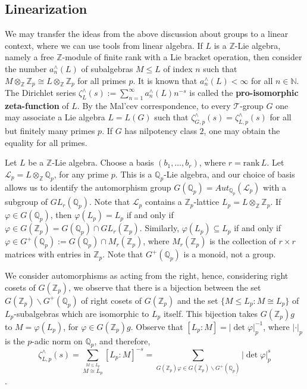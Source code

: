 \documentclass[12pt]{article}
\begin{document}
\subsection{Linearization}
We may transfer the ideas from the above discussion about groups to a linear context, where we can use tools from linear algebra.
If $L$ is a $\mathbb{Z}$-Lie algebra, namely a free $\mathbb{Z}$-module of finite rank with a Lie bracket operation, then consider the number $a_{n}^{\wedge}(L)$ of subalgebras $M\leq L$ of index $n$ such that $M\otimes_{\mathbb{Z}}\mathbb{Z}_p\cong L\otimes_{\mathbb{Z}}\mathbb{Z}_p$ for all primes $p$. It is known that $a_{n}^{\wedge}(L)<\infty$ for all $n\in\mathbb{N}$. The Dirichlet series $\zeta_{L}^{\wedge}(s):=\sum_{n=1}^{\infty}{a_{n}^{\wedge}}(L)n^{-s}$ is called the \textbf{pro-isomorphic zeta-function} of $L$. By the Mal'cev correspondence, to every $\mathcal{T}$-group $G$ one may associate a Lie algebra $L=L(G)$ such that $\zeta_{G,p}^{\wedge}(s)=\zeta_{L,p}^{\wedge}(s)$ for all but finitely many primes $p$. If $G$ has nilpotency class $2$, one may obtain the equality for all primes.\par
Let $L$ be a $\mathbb{Z}$-Lie algebra. Choose a basis $(b_1,\dots,b_r)$, where $r=\mathrm{rank}\,L$. Let $\mathcal{L}_{p}=L\otimes_{\mathbb{Z}}\mathbb{Q}_p$, for any prime $p$. This is a $\mathbb{Q}_p$-Lie algebra, and our choice of basis allows us to identify the automorphism group $G(\mathbb{Q}_p)=Aut_{\mathbb{Q}_p}(\mathcal{L}_{p})$ with a subgroup of $GL_r(\mathbb{Q}_p)$. Note that $\mathcal{L}_{p}$ contains a $\mathbb{Z}_p$-lattice $L_{p}=L\otimes_{\mathbb{Z}}\mathbb{Z}_p$. If $\varphi\in G(\mathbb{Q}_p)$, then $\varphi(L_{p})=L_{p}$ if and only if $\varphi\in G(\mathbb{Z}_p)=G(\mathbb{Q}_p)\cap GL_r(\mathbb{Z}_p)$. Similarly, $\varphi(L_{p})\subseteq L_{p}$ if and only if $\varphi\in G^{+}(\mathbb{Q}_p):=G(\mathbb{Q}_p)\cap {M}_r(\mathbb{Z}_p)$, where ${M}_r(\mathbb{Z}_p)$ is the collection of $r\times r$ matrices with entries in $\mathbb{Z}_p$. Note that $G^{+}(\mathbb{Q}_p)$ is a monoid, not a group.\par
We consider automorphisms as acting from the right, hence, considering right cosets of $G(\mathbb{Z}_p)$, we observe that there is a bijection between the set $G(\mathbb{Z}_p)\backslash G^{+}(\mathbb{Q}_p)$ of right cosets of $G(\mathbb{Z}_p)$ and the set $\{M\leq L_{p} : M\cong L_{p}\}$ of $L_{p}$-subalgebras which are isomorphic to $L_{p}$ itself. This bijection takes $G(\mathbb{Z}_p)g$ to $M=\varphi(L_{p})$, for $\varphi\in G(\mathbb{Z}_p)g$.
Observe that $[L_{p}:M]=|\det\varphi|_p^{-1}$, where $|\cdot|_p$ is the $p$-adic norm on $\mathbb{Q}_{p}$, and therefore,
\begin{equation}
\label{eq:proisomorphic.zeta}
\zeta_{L,p}^{\wedge}(s)=\underset{\overset{\scriptscriptstyle M\leq L_{p}}{\scriptscriptstyle M\cong L_{p}}}{\sum}[L_{p}:M]^{-s}=\underset{\scriptscriptstyle G(\mathbb{Z}_p)\varphi\in G(\mathbb{Z}_p)\backslash G^{+}(\mathbb{Q}_p)}{\sum}|\det\varphi|_p^s
\end{equation}.
\end{document}
